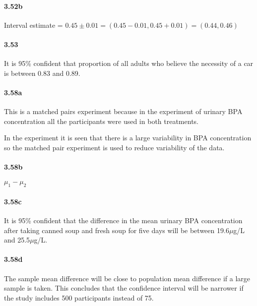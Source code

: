 \documentclass[
]{article}
\begin{document}
\hypertarget{b-4}{%
\paragraph{3.52b}\label{b-4}}

Interval estimate =
\(0.45 \pm 0.01 = (0.45-0.01, 0.45+0.01) = (0.44,0.46)\)

\hypertarget{section-2}{%
\paragraph{3.53}\label{section-2}}

It is 95\% confident that proportion of all adults who believe the
necessity of a car is between 0.83 and 0.89.

\hypertarget{a-5}{%
\paragraph{3.58a}\label{a-5}}

This is a matched pairs experiment because in the experiment of urinary
BPA concentration all the participants were used in both treatments.

In the experiment it is seen that there is a large variability in BPA
concentration so the matched pair experiment is used to reduce
variability of the data.

\hypertarget{b-5}{%
\paragraph{3.58b}\label{b-5}}

\(\mu_1-\mu_2\)

\hypertarget{c-3}{%
\paragraph{3.58c}\label{c-3}}

It is 95\% confident that the difference in the mean urinary BPA
concentration after taking canned soup and fresh soup for five days will
be between 19.6\(\mu\)g/L and 25.5\(\mu\)g/L.

\hypertarget{d-1}{%
\paragraph{3.58d}\label{d-1}}

The sample mean difference will be close to population mean difference
if a large sample is taken. This concludes that the confidence interval
will be narrower if the study includes 500 participants instead of 75.
\end{document}
